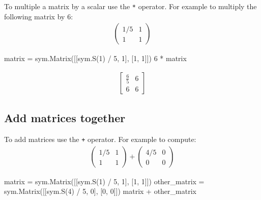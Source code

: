 To multiple a matrix by a scalar use the \texttt{*} operator. For example to
multiply the following matrix by \(6\):
\begin{equation*}
\begin{split}
    \begin{pmatrix}
        1 / 5 & 1\\
        1 & 1
    \end{pmatrix}
\end{split}
\end{equation*}



\begin{pyin}
matrix = sym.Matrix([[sym.S(1) / 5, 1], [1, 1]])
6 * matrix
\end{pyin}




\begin{equation*}
\begin{split}\displaystyle \left[\begin{matrix}\frac{6}{5} & 6\\6 & 6\end{matrix}\right]\end{split}
\end{equation*}




\subsection{Add matrices together}
\label{\detokenize{tools-for-mathematics/04-matrices/how/main:add-matrices-together}}

To add matrices use the \texttt{+} operator. For example to compute:
\begin{equation*}
\begin{split}
    \begin{pmatrix}
        1 / 5 & 1\\
        1 & 1
    \end{pmatrix} +
    \begin{pmatrix}
        4 / 5 & 0\\
        0 & 0
    \end{pmatrix}
\end{split}
\end{equation*}



\begin{pyin}
matrix = sym.Matrix([[sym.S(1) / 5, 1], [1, 1]])
other_matrix = sym.Matrix([[sym.S(4) / 5, 0], [0, 0]])
matrix + other_matrix
\end{pyin}




